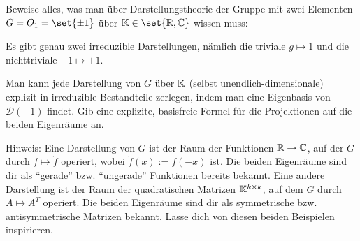 
\begin{problem}[title={Darstellungstheorie von $O_1$}]
Beweise alles, was man über Darstellungstheorie der Gruppe mit zwei Elementen $G=O_1=\set{\pm 1}$ über $\IK\in\set{\IR,\IC}$ wissen muss:

\begin{subproblem}
Es gibt genau zwei irreduzible Darstellungen, nämlich die triviale $g\mapsto 1$ und die nichttriviale $\pm 1\mapsto \pm 1$.
\end{subproblem}
\begin{subproblem}
Man kann jede Darstellung von $G$ über $\mathbb{K}$ (selbst unendlich-dimensionale) explizit in irreduzible Bestandteile zerlegen, indem man eine Eigenbasis von $\mathcal{D}(-1)$ findet. Gib eine explizite, basisfreie Formel für die Projektionen auf die beiden Eigenräume an.
\end{subproblem}

Hinweis: Eine Darstellung von $G$ ist der Raum der Funktionen $\mathbb{R} \to \mathbb{C}$, auf der $G$ durch $f\mapsto \check{f}$ operiert, wobei $\check{f}(x) := f(-x)$ ist. Die beiden Eigenräume sind dir als \enquote{gerade} bzw. \enquote{ungerade} Funktionen bereits bekannt. Eine andere Darstellung ist der Raum der quadratischen Matrizen $\mathbb{K}^{k\times k}$, auf dem $G$ durch $A\mapsto A^T$ operiert. Die beiden Eigenräume sind dir als symmetrische bzw. antisymmetrische Matrizen bekannt. Lasse dich von diesen beiden Beispielen inspirieren.
\end{problem}
